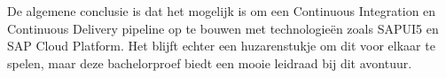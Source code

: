 De algemene conclusie is dat het mogelijk is om een Continuous Integration en Continuous Delivery pipeline op te bouwen met technologieën zoals SAPUI5 en SAP Cloud Platform. Het blijft echter een huzarenstukje om dit voor elkaar te spelen, maar deze bachelorproef biedt een mooie leidraad bij dit avontuur.